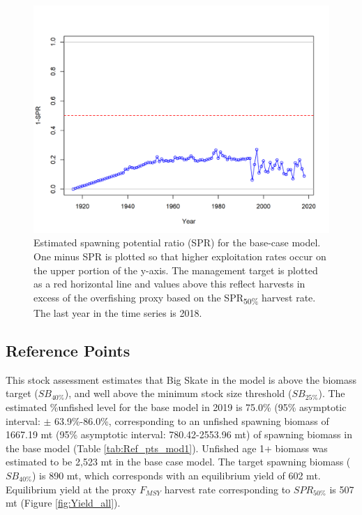 \documentclass[12pt,]{article}
\begin{document}
\FloatBarrier

\begin{figure}
\centering
\includegraphics{r4ss/plots_mod1/SPR2_minusSPRseries.png}
\caption{Estimated spawning potential ratio (SPR) for the base-case
model. One minus SPR is plotted so that higher exploitation rates occur
on the upper portion of the y-axis. The management target is plotted as
a red horizontal line and values above this reflect harvests in excess
of the overfishing proxy based on the SPR\textsubscript{50\%} harvest
rate. The last year in the time series is 2018. \label{fig:SPR_all}}
\end{figure}

\FloatBarrier

\hypertarget{reference-points}{%
\subsection*{Reference Points}\label{reference-points}}

This stock assessment estimates that Big Skate in the model is above the
biomass target (\(SB_{40\%}\)), and well above the minimum stock size
threshold (\(SB_{25\%}\)). The estimated \%unfished level for the base
model in 2019 is 75.0\% (95\% asymptotic interval: \(\pm\)
63.9\%-86.0\%, corresponding to an unfished spawning biomass of 1667.19
mt (95\% asymptotic interval: 780.42-2553.96 mt) of spawning biomass in
the base model (Table \ref{tab:Ref_pts_mod1}). Unfished age 1+ biomass
was estimated to be 2,523 mt in the base case model. The target spawning
biomass (\(SB_{40\%}\)) is 890 mt, which corresponds with an equilibrium
yield of 602 mt. Equilibrium yield at the proxy \(F_{MSY}\) harvest rate
corresponding to \(SPR_{50\%}\) is 507 mt (Figure \ref{fig:Yield_all}).
\end{document}
